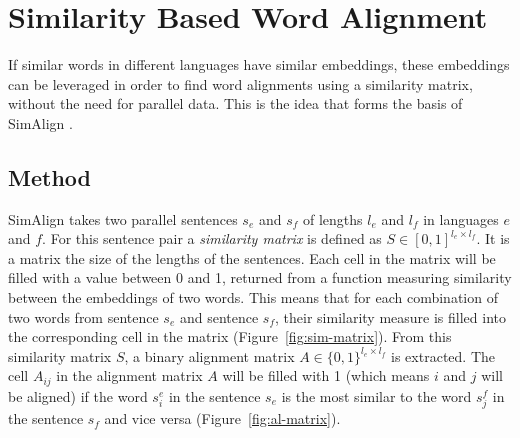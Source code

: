 \section{Similarity Based Word Alignment}



If similar words in different languages have similar embeddings, these embeddings can be  leveraged in order to find word alignments using a similarity matrix, without the need for parallel data. This is the idea that forms the basis of SimAlign \autocite{jalili-sabet-etal-2020-simalign}.

\subsection{Method}
\label{subsec:simalign-method}
SimAlign takes two parallel sentences $s_e$ and $s_f$ of lengths $l_e$ and $l_f$ in languages $e$ and $f$. 
For this sentence pair a \emph{similarity matrix} is defined as $S \in [0,1]^{l_e\times l_f}$. 
It is a matrix the size of the lengths of the sentences. Each cell in the matrix will be filled with a value between 0 and 1, returned from a function measuring similarity between the embeddings of two words. 
This means that for each combination of two words from sentence $s_e$ and sentence $s_f$, their similarity measure is filled into the corresponding cell in the matrix (Figure~\ref{fig:sim-matrix}).
From this similarity matrix $S$, a binary alignment matrix $A \in \{0,1\}^{l_e \times l_f}$ is extracted. 
The cell $A_{ij}$ in the alignment matrix $A$ will be filled with 1 (which means $i$ and $j$ will be aligned) if the word $s_i^e$ in the sentence $s_e$ is the most similar to the word $s_j^f$ in the sentence $s_f$ and vice versa (Figure~\ref{fig:al-matrix}).



